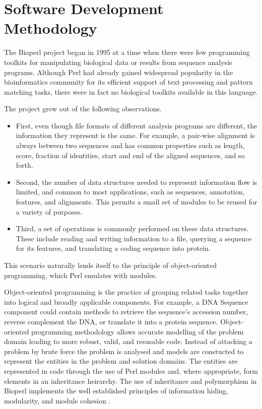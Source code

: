 \documentclass[12pt]{article}
\begin{document}
\section{Software Development Methodology}

The Bioperl project began in 1995 \cite{chervitz-bits} at a time when
there were few programming toolkits for manipulating biological data
or results from sequence analysis programs.  Although Perl had already
gained widespread popularity in the bioinformatics community for its
efficient support of text processing and pattern matching tasks, there
were in fact no biological toolkits available in this language.

The project grew out of the following observations.  
\begin{itemize}

\item First, even though file formats of different analysis programs
are different, the information they represent is the same.  For
example, a pair-wise alignment is always between two sequences and has
common properties such as length, score, fraction of identities, start
and end of the aligned sequences, and so forth.

\item Second, the number of data structures needed to represent
information flow is limited, and common to most applications, such as
sequences, annotation, features, and alignments.  This permits a 
small set of modules to be reused for a variety of purposes.

\item Third, a set of operations is commonly performed on these data
structures.  These include reading and writing information to a file,
querying a sequence for its features, and translating a coding
sequence into protein.

\end{itemize}

This scenario naturally lends itself to the principle of
object-oriented programming, which Perl emulates with modules.

Object-oriented programming is the practice of grouping related tasks
together into logical and broadly applicable components.  For example,
a DNA Sequence component could contain methods to retrieve the
sequence's accession number, reverse complement the DNA, or translate
it into a protein sequence.  Object-oriented programming methodology
allows accurate modelling of the problem domain leading to more
robust, valid, and resusable code. Instead of attacking a problem by
brute force the problem is analysed and models are constucted to
represent the entities in the problem and solution domains. The
entities are represented in code through the use of Perl modules and,
where appropriate, form elements in an inheritance heirarchy.  The use
of inheritance and polymorphism in Bioperl implements the well
established principles of information hiding, modularity, and module
cohesion \cite{tremblay}.
\end{document}
